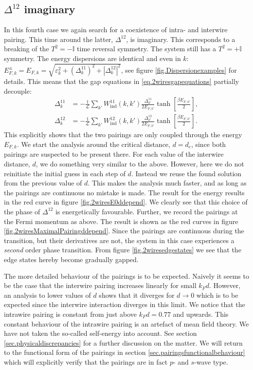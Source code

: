 \subsection{\texorpdfstring{$\Delta^{12}$}{Interwire pairing} imaginary}
In this fourth case we again search for a coexistence of intra- and interwire pairing. This time around the latter, $\Delta^{12}$, is imaginary. This corresponds to a breaking of the $T^2 = -\mathbb{I}$ time reversal symmetry. The system still has a $T^2 = + \mathbb{I}$ symmetry. The energy dispersions are identical and even in $k$: $E^{\pm}_{F,k} = E_{F,k} = \sqrt{\varepsilon_k^2 + (\Delta^{11}_k)^2 + |\Delta^{12}_k|^2}$, see figure \ref{fig.Dispersionexamples} for details. This means that the gap equations in \eqref{eq.2wiresgapequations} partially decouple: 
\begin{align}
\Delta^{11}_k &= -\frac{1}{\mathcal{L}}\sum_{k'} W_{\text{ind}}^{11}(k, k')\frac{\Delta^{11}_{k'}}{2E_{F,k'}}\tanh\left[\frac{\beta E_{F,k'}}{2}\right], \nonumber \\
\Delta^{12}_k &= -\frac{1}{\mathcal{L}}\sum_{k'} W_{\text{ind}}^{12}(k, k')\frac{\Delta^{12}_{k'}}{2E_{F,k'}}\tanh\left[\frac{\beta E_{F,k'}}{2}\right].
\label{eq.2wiresgapequationsDelta12imaginary}
\end{align} 
This explicitly shows that the two pairings are only coupled through the energy $E_{F,k}$. We start the analysis around the critical distance, $d = d_c$, since both pairings are suspected to be present there. For each value of the interwire distance, $d$, we do something very similar to the above. However, here we do not reinitiate the initial guess in each step of $d$. Instead we reuse the found solution from the previous value of $d$. This makes the analysis much faster, and as long as the pairings are continuous no mistake is made. The result for the energy results in the red curve in figure \ref{fig.2wiresE0ddepend}. We clearly see that this choice of the phase of $\Delta^{12}$ is energetically favourable. Further, we record the pairings at the Fermi momentum as above. The result is shown as the red curves in figure \ref{fig.2wiresMaximalPairingddepend}. Since the pairings are continuous during the transition, but their derivatives are not, the system in this case experiences a \textit{second} order phase transition. From figure \ref{fig.2wiresedgestates} we see that the edge states hereby become gradually gapped. 

The more detailed behaviour of the pairings is to be expected. Naively it seems to be the case that the interwire pairing increases linearly for small $k_Fd$. However, an analysis to lower values of $d$ shows that it diverges for $d \to 0$ which is to be expected since the interwire interaction diverges in this limit. We notice that the intrawire pairing is constant from just above $k_Fd = 0.77$ and upwards. This constant behaviour of the intrawire pairing is an artefact of mean field theory. We have not taken the so-called self-energy into account. See section \ref{sec.physicaldiscrepancies} for a further discussion on the matter. We will return to the functional form of the pairings in section \ref{sec.pairingsfunctionalbehaviour} which will explicitly verify that the pairings are in fact $p$- and $s$-wave type.  


